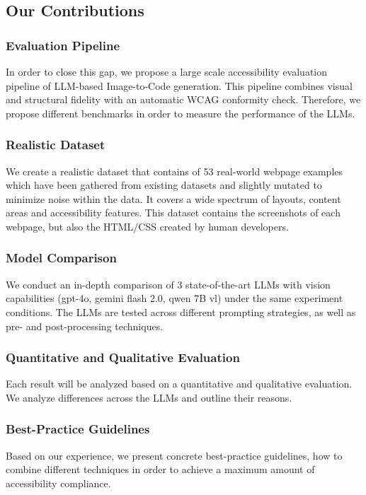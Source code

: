 \subsection{Our Contributions}

\subsubsection{Evaluation Pipeline}
In order to close this gap, we propose a large scale accessibility evaluation pipeline of LLM-based
Image-to-Code generation. This pipeline combines visual and structural fidelity with an automatic 
WCAG conformity check. Therefore, we propose different benchmarks in 
order to measure the performance of the LLMs.

\subsubsection{Realistic Dataset}
We create a realistic dataset that contains of 53 real-world webpage 
examples which have been gathered from existing datasets and slightly mutated to
minimize noise within the data. It covers a wide spectrum of layouts, content 
areas and accessibility features. This dataset contains the screenshots 
of each webpage, but also the HTML/CSS created by human developers.

\subsubsection{Model Comparison}
We conduct an in-depth comparison of 3 state-of-the-art LLMs 
with vision capabilities (gpt-4o, gemini flash 2.0, qwen 7B vl) under the 
same experiment conditions. The LLMs are tested across different prompting 
strategies, as well as pre- and post-processing techniques.

\subsubsection{Quantitative and Qualitative Evaluation}
Each result will be analyzed based on a quantitative and qualitative 
evaluation. We analyze differences across the LLMs and outline their
reasons.

\subsubsection{Best-Practice Guidelines}
Based on our experience, we present concrete best-practice guidelines, how 
to combine different techniques in order to achieve a maximum amount 
of accessibility compliance.




